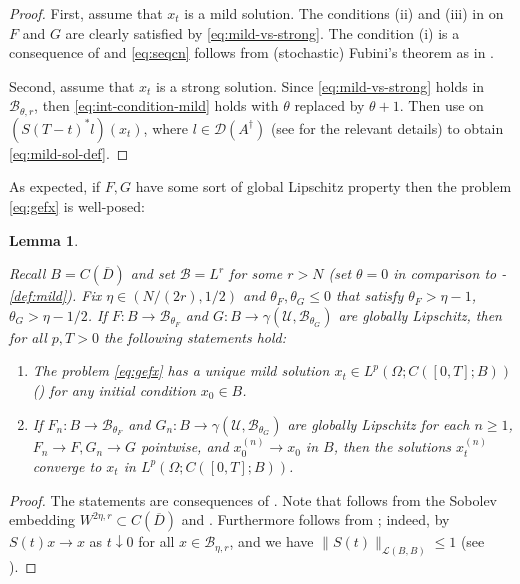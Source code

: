\documentclass[final]{amsart}
\newtheorem{lem}[thm]{Lemma}
\numberwithin{thm}{section}
\numberwithin{equation}{section}
\newcommand{\U}{\mathcal{U}}
\newcommand{\Dm}{\mathcal{D}}
\newcommand{\Ll}{\mathcal{L}}
\newcommand{\B}{\mathcal{B}}
\begin{document}
\begin{proof}
First, assume that $x_t$ is a mild solution. 
    The conditions (ii) and (iii) in  on $F$ and $G$ are clearly satisfied by \eqref{eq:mild-vs-strong}. The condition (i) is a consequence of  and \eqref{eq:seqcn} follows from (stochastic) Fubini's theorem as in \cite[Proposition 1.3.5]{mild-strong}.

Second, assume that  $x_t$ is a strong solution.  Since \eqref{eq:mild-vs-strong} holds in $\B_{\theta, r}$, then \eqref{eq:int-condition-mild} holds with $\theta$ replaced by $\theta+1$. Then use \cite[Corollary 2.6]{ito-formula} on $(S(T-t)^*l)(x_t)$, where $l \in \Dm(A^\dagger)$ (see \cite[Proposition 6.7]{hairer-notes} for the relevant details) to obtain \eqref{eq:mild-sol-def}.
\end{proof}

As expected, if $F,G$ have some sort of global Lipschitz property then the problem \eqref{eq:gefx} is well-posed:

\begin{lem}\label{general-mild-existence}
    
    Recall $B = C(\overline D)$ and set $\B = L^r$ for some $r > N$
    (set $\theta = 0$ in comparison to -\ref{def:mild}).  Fix $\eta \in (N/(2r), 1/2)$ and $\theta_F, \theta_G \leq 0$ that satisfy $\theta_F > \eta - 1$, $\theta_G > \eta - 1/2$. If $F: B \to \B_{\theta_F}$ and $G: B \to \gamma(\U,\B_{\theta_G})$ are globally Lipschitz, then for all $p,T > 0$ the following statements hold: 
    \begin{enumerate}[label=(\roman*)]
        \item The problem \eqref{eq:gefx} has a unique mild solution $x_t \in L^p(\Omega; C([0,T];B))$ () for any initial condition $x_0 \in B$.
        \item If $F_n: B \to \B_{\theta_F}$ and $G_n: B \to \gamma(\U,\B_{\theta_G})$ are globally Lipschitz for each $n \geq 1$, $F_n \to F, G_n \to G$ pointwise, and $x_0^{(n)} \to x_0$ in $B$, then the solutions $x_t^{(n)}$ converge to $x_t$ in $L^p(\Omega; C([0,T];B))$.
    \end{enumerate}
\end{lem}

\begin{proof}
    The statements are consequences of \cite[Proposition 3.8]{feller-stoch-reac-diff}. Note that \cite[(A5)]{feller-stoch-reac-diff} follows from the Sobolev embedding $W^{2\eta, r} \subset C(\overline D)$ and . Furthermore \cite[(A4)]{feller-stoch-reac-diff} follows from \cite[Exercise 5.2]{hairer-notes}; indeed, by \cite[(A5)]{feller-stoch-reac-diff} $S(t)x \to x$ as $t \downarrow 0$ for all $x \in \B_{\eta,r}$, and we have $\|S(t)\|_{\Ll(B,B)} \leq 1$ (see ).
\end{proof}
\end{document}
